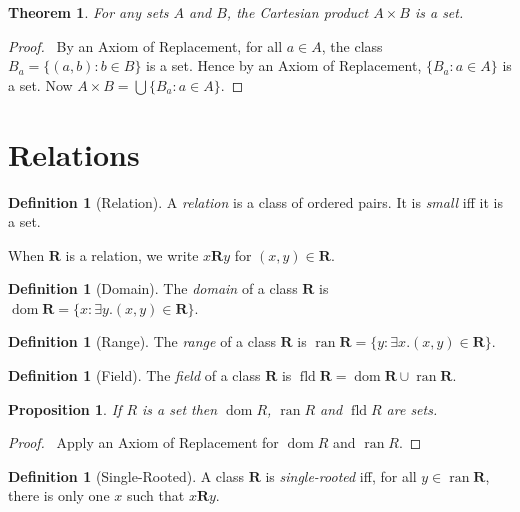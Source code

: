 \documentclass{report}
\let\qed\relax
\newtheorem{proposition}[axiom]{Proposition}
\newtheorem{theorem}[axiom]{Theorem}
\theoremstyle{definition}
\newtheorem{definition}[axiom]{Definition}
\newcommand{\dom}{\ensuremath{\operatorname{dom}}}
\newcommand{\fld}{\ensuremath{\operatorname{fld}}}
\newcommand{\ran}{\ensuremath{\operatorname{ran}}}
\begin{document}
    \begin{theorem}
        For any sets $A$ and $B$, the Cartesian product $A \times B$ is a set.
    \end{theorem}

    \begin{proof}
        \pf\ By an Axiom of Replacement, for all $a \in A$, the class $B_a = \{ (a,b) : b \in B \}$ is a
        set. Hence by an Axiom of Replacement, $\{ B_a : a \in A \}$ is a set. Now $A \times B =
        \bigcup \{ B_a : a \in A \}$.
    \end{proof}

    \section{Relations}

    \begin{definition}[Relation]
        A \emph{relation} is a class of ordered pairs. It is \emph{small} iff it is a set.

        When $\mathbf{R}$ is a relation, we write $x \mathbf{R} y$ for $(x,y) \in \mathbf{R}$.
    \end{definition}

    \begin{definition}[Domain]
        The \emph{domain} of a class $\mathbf{R}$ is $\dom \mathbf{R} = \{ x : \exists y. (x,y) \in \mathbf{R} \}$.
    \end{definition}

    \begin{definition}[Range]
        The \emph{range} of a class $\mathbf{R}$ is $\ran \mathbf{R} = \{ y : \exists x. (x,y) \in \mathbf{R} \}$.
    \end{definition}

    \begin{definition}[Field]
        The \emph{field} of a class $\mathbf{R}$ is $\fld \mathbf{R} = \dom \mathbf{R} \cup \ran \mathbf{R}$.
    \end{definition}

    \begin{proposition}
        If $R$ is a set then $\dom R$, $\ran R$ and $\fld R$ are sets.
    \end{proposition}

    \begin{proof}
        \pf\ Apply an Axiom of Replacement for $\dom R$ and $\ran R$. \qed
    \end{proof}
    
    \begin{definition}[Single-Rooted]
        A class $\mathbf{R}$ is \emph{single-rooted} iff, for all $y \in \ran \mathbf{R}$,
        there is only one $x$ such that $x \mathbf{R} y$.
    \end{definition}
\end{document}
